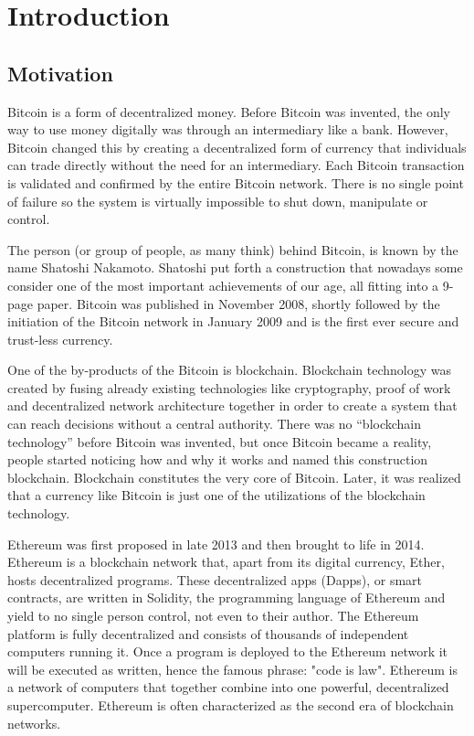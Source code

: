 \chapter{Introduction}

\section{Motivation}

Bitcoin is a form of decentralized money. Before Bitcoin was invented, the only
way to use money digitally was through an intermediary like a bank. However,
Bitcoin changed this by creating a decentralized form of currency that
individuals can trade directly without the need for an intermediary. Each
Bitcoin transaction is validated and confirmed by the entire Bitcoin network.
There is no single point of failure so the system is virtually impossible to
shut down, manipulate or control.

The person (or group of people, as many think) behind Bitcoin, is known by the
name Shatoshi Nakamoto. Shatoshi put forth a construction that nowadays some
consider one of the most important achievements of our age, all fitting into a
9-page paper.  Bitcoin was published in November 2008, shortly followed by the
initiation of the Bitcoin network in January 2009 and is the first ever secure
and trust-less currency.

One of the by-products of the Bitcoin is blockchain. Blockchain technology was
created by fusing already existing technologies like cryptography, proof of
work and decentralized network architecture together in order to create a
system that can reach decisions without a central authority. There was no
“blockchain technology” before Bitcoin was invented, but once Bitcoin became a
reality, people started noticing how and why it works and named this
construction blockchain. Blockchain constitutes the very core of Bitcoin.
Later, it was realized that a currency like Bitcoin is just one of the
utilizations of the blockchain technology.

Ethereum was first proposed in late 2013 and then brought to life in 2014.
Ethereum is a blockchain network that, apart from its digital currency, Ether,
hosts decentralized programs. These decentralized apps (Dapps), or smart
contracts, are written in Solidity, the programming language of Ethereum and
yield to no single person control, not even to their author.  The Ethereum
platform is fully decentralized and consists of thousands of independent
computers running it. Once a program is deployed to the Ethereum network it
will be executed as written, hence the famous phrase: "code is law". Ethereum
is a network of computers that together combine into one powerful,
decentralized supercomputer. Ethereum is often characterized as the second era
of blockchain networks.

